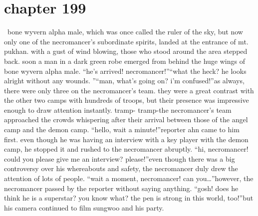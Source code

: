 \section{chapter 199}






 bone wyvern alpha male, which was once called the ruler of the sky, but now only one of the necromancer’s subordinate spirits, landed at the entrance of mt.
 pukhan.
with a gust of wind blowing, those who stood around the area stepped back.
soon a man in a dark green robe emerged from behind the huge wings of bone wyvern alpha male.
“he’s arrived! necromancer!”“what the heck? he looks alright without any wounds.
”“man, what’s going on? i’m confused!”as always, there were only three on the necromancer’s team.
 they were a great contrast with the other two camps with hundreds of troops, but their presence was impressive enough to draw attention instantly.
tramp- tramp-the necromancer’s team approached the crowds whispering after their arrival between those of the angel camp and the demon camp.
“hello, wait a minute!”reporter ahn came to him first.
 even though he was having an interview with a key player with the demon camp, he stopped it and rushed to the necromancer abruptly.
“hi, necromancer! could you please give me an interview? please!”even though there was a big controversy over his whereabouts and safety, the necromancer duly drew the attention of lots of people.
“wait a moment, necromancer! can you…”however, the necromancer passed by the reporter without saying anything.
“gosh! does he think he is a superstar? you know what? the pen is strong in this world, too!”but his camera continued to film sungwoo and his party.

